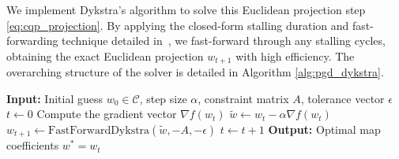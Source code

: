We implement Dykstra's algorithm to solve this Euclidean projection step \eqref{eq:cqp_projection}.
By applying the closed-form stalling duration and fast-forwarding technique detailed in~\cite{Vestini2025}, we fast-forward through any stalling cycles, obtaining the exact Euclidean projection $w_{t+1}$ with high efficiency. The overarching structure of the solver is detailed in Algorithm \ref{alg:pgd_dykstra}.

\begin{algorithm}
\caption{Projected Gradient Descent with Fast-Forward Dykstra}\label{alg:pgd_dykstra}
\begin{algorithmic}[1]
\State \textbf{Input:} Initial guess $w_0 \in \mathcal{C}$, step size $\alpha$, constraint matrix $A$, tolerance vector $\epsilon$
\State $t \gets 0$
    \State Compute the gradient vector $\nabla f(w_t)$
    \State $\tilde{w} \gets w_t - \alpha \nabla f(w_t)$ 
    \State $w_{t+1} \gets \text{FastForwardDykstra}(\tilde{w}, -A, -\epsilon)$ 
    \State $t \gets t + 1$
\EndWhile
\State \textbf{Output:} Optimal map coefficients $w^* = w_t$
\end{algorithmic}
\end{algorithm}